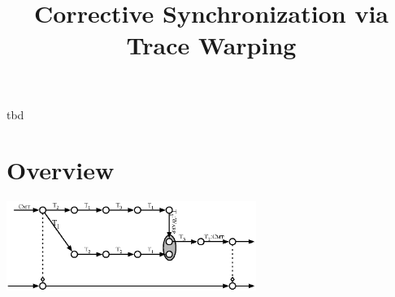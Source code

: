 \documentclass{sigplanconf}
\begin{document}
\title{Corrective Synchronization via Trace Warping}
 {tbd}

 {} {} 

\maketitle





\section{Overview}

\includegraphics[width=3.2in]{simulation.eps}






\newcommand{\pietrotodo}[1]{{\bf #1}}
















{%

%

}


\newpage
\appendix




\end{document}
